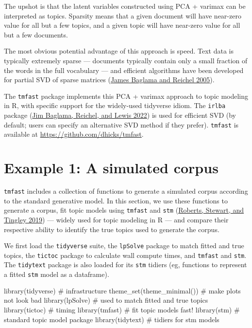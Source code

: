 \documentclass[
]{article}
\newenvironment{Shaded}{\begin{snugshade}}{\end{snugshade}}
\newcommand{\CommentTok}[1]{\textcolor[rgb]{0.37,0.37,0.37}{#1}}
\newcommand{\FunctionTok}[1]{\textcolor[rgb]{0.28,0.35,0.67}{#1}}
\newcommand{\NormalTok}[1]{\textcolor[rgb]{0.00,0.23,0.31}{#1}}
\begin{document}
The upshot is that the latent variables constructed using PCA + varimax
can be interpreted as topics. Sparsity means that a given document will
have near-zero value for all but a few topics, and a given topic will
have near-zero value for all but a few documents.

The most obvious potential advantage of this approach is speed. Text
data is typically extremely sparse --- documents typically contain only
a small fraction of the words in the full vocabulary --- and efficient
algorithms have been developed for partial SVD of sparse matrices
(\protect\hyperlink{ref-BaglamaAugmentedImplicitlyRestarted2005}{James
Baglama and Reichel 2005}).

The \texttt{tmfast} package implements this PCA + varimax approach to
topic modeling in R, with specific support for the widely-used tidyverse
idiom. The \texttt{irlba} package
(\protect\hyperlink{ref-BaglamaIrlbaFastTruncated2022}{Jim Baglama,
Reichel, and Lewis 2022}) is used for efficient SVD (by default; users
can specify an alternative SVD method if they prefer). \texttt{tmfast}
is available at \url{https://github.com/dhicks/tmfast}.

\hypertarget{sec-sim}{%
\section{Example 1: A simulated corpus}\label{sec-sim}}

\texttt{tmfast} includes a collection of functions to generate a
simulated corpus according to the standard generative model. In this
section, we use these functions to generate a corpus, fit topic models
using \texttt{tmfast} and \texttt{stm}
(\protect\hyperlink{ref-RobertsStmPackageStructural2019}{Roberts,
Stewart, and Tingley 2019}) --- widely used for topic modeling in R ---
and compare their respective ability to identify the true topics used to
generate the corpus.

We first load the \texttt{tidyverse} suite, the \texttt{lpSolve} package
to match fitted and true topics, the \texttt{tictoc} package to
calculate wall compute times, and \texttt{tmfast} and \texttt{stm}. The
\texttt{tidytext} package is also loaded for its \texttt{stm} tidiers
(eg, functions to represent a fitted \texttt{stm} model as a dataframe).

\begin{Shaded}
\begin{Highlighting}[]
\FunctionTok{library}\NormalTok{(tidyverse)          }\CommentTok{\# infrastructure}
\FunctionTok{theme\_set}\NormalTok{(}\FunctionTok{theme\_minimal}\NormalTok{())  }\CommentTok{\# make plots not look bad}
\FunctionTok{library}\NormalTok{(lpSolve)            }\CommentTok{\# used to match fitted and true topics}
\FunctionTok{library}\NormalTok{(tictoc)             }\CommentTok{\# timing}
\FunctionTok{library}\NormalTok{(tmfast)             }\CommentTok{\# fit topic models fast! }
\FunctionTok{library}\NormalTok{(stm)                }\CommentTok{\# standard topic model package}
\FunctionTok{library}\NormalTok{(tidytext)           }\CommentTok{\# tidiers for stm models}
\end{Highlighting}
\end{Shaded}
\end{document}
